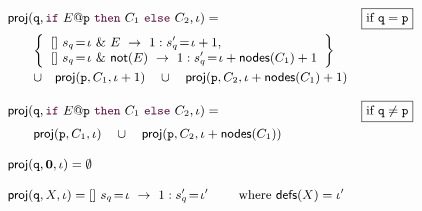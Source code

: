 \begin{definition}
\begin{displaymath}
\begin{array}{lr}
        \end{array}
      \end{displaymath}


  \begin{displaymath}\small
        \begin{array}{lr}

          \proj (\role q,\ifTE {E}{p}{C_1}{C_2}, \iota) = 
          &  \boxed{\text{if }\role q=\role p}\\[2mm]
          \qquad\left\{ 
          \begin{array}{lll}
            \commandBase {} {s_{q}\!=\! \iota\ \&\ E}{\ 1: s'_{q}\!=\! \iota+1},\\ 
            \commandBase {} {s_{q}\!=\! \iota\ \&\ \mathsf{not}(E)}
            {\ 1: s'_{q}\!=\! \iota+\mathsf{nodes}(C_1)+1}
          \end{array}
          \right\}
          \\[3mm]
          \qquad\cup\quad \proj (\role{p}, C_1, \iota+1)
          \quad\cup\quad
          \proj (\role{p}, C_2, \iota+\mathsf{nodes}(C_1)+1)
          \\\\

          \proj (\role q,\ifTE {E}{p}{C_1}{C_2}, \iota) = 
          &  \boxed{\text{if }\role q\neq\role p}\\[2mm]


          \qquad \proj (\role{p}, C_1, \iota)
          \quad\cup\quad
          \proj (\role{p}, C_2, \iota+\mathsf{nodes}(C_1))



          \\\\

          \proj (\role q,\CEnd, \iota) = \emptyset

          \\\\

          \proj (\role q, X, \iota) = 
          \commandBase {} {s_{q}\!=\! \iota}{\ 1: s'_{q}\!=\! \iota'}
          \qquad\text{ where } \textsf{defs}(X) = \iota'

        \end{array}
      \end{displaymath}
    \end{definition}
